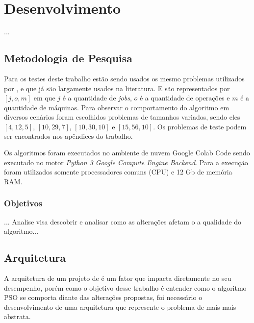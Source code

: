 
\chapter{Desenvolvimento}
        ...


\section{Metodologia de Pesquisa}
        Para os testes deste trabalho estão sendo usados os mesmo problemas utilizados por \cite{Kacem2002}, e que já são largamente usados na literatura. E são representados por $[j, o, m]$ em que $j$ é a quantidade de \textit{jobs}, $o$ é a quantidade de operações e $m$ é a quantidade de máquinas. Para observar o comportamento do algoritmo em diversos cenários foram escolhidos problemas de tamanhos variados, sendo eles $[4, 12, 5]$, $[10, 29, 7]$, $[10, 30, 10]$ e $[15, 56, 10]$. Os problemas de teste podem ser encontrados nos apêndices do trabalho.\newline

        Os algoritmos foram executados no ambiente de nuvem Google Colab Code sendo executado no motor \textit{Python 3 Google Compute Engine Backend}. Para a execução foram utilizados somente processadores comuns (CPU) e 12 Gb de memória RAM.

    \subsection{Objetivos}
        ... Analise visa descobrir e analisar como as alterações afetam o a qualidade do algoritmo...


\section{Arquitetura}
        A arquitetura de um projeto de é um fator que impacta diretamente no seu desempenho, porém como o objetivo desse trabalho é entender como o algoritmo PSO se comporta diante das alterações propostas, foi necessário o desenvolvimento de uma arquitetura que represente o problema de mais mais abstrata.

